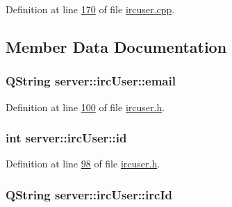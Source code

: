 Definition at line \hyperlink{custom_irc_server_2ircuser_8cpp_source_l00170}{170} of file \hyperlink{custom_irc_server_2ircuser_8cpp_source}{ircuser.\-cpp}.



\subsection{Member Data Documentation}
\hypertarget{classserver_1_1irc_user_aeadaf50889cd947cb5080cb9fe0707bd}{
\subsubsection[{email}]{\setlength{\rightskip}{0pt plus 5cm}Q\-String server\-::irc\-User\-::email\hspace{0.3cm}{\ttfamily [private]}}}\label{d2/d29/classserver_1_1irc_user_aeadaf50889cd947cb5080cb9fe0707bd}


Definition at line \hyperlink{custom_irc_server_2ircuser_8h_source_l00100}{100} of file \hyperlink{custom_irc_server_2ircuser_8h_source}{ircuser.\-h}.

\hypertarget{classserver_1_1irc_user_af55b2056fb7f59055417bda5d3187b4e}{
\subsubsection[{id}]{\setlength{\rightskip}{0pt plus 5cm}int server\-::irc\-User\-::id\hspace{0.3cm}{\ttfamily [private]}}}\label{d2/d29/classserver_1_1irc_user_af55b2056fb7f59055417bda5d3187b4e}


Definition at line \hyperlink{custom_irc_server_2ircuser_8h_source_l00098}{98} of file \hyperlink{custom_irc_server_2ircuser_8h_source}{ircuser.\-h}.

\hypertarget{classserver_1_1irc_user_a0380d5ace6770dbdc30187d348d837ed}{
\subsubsection[{irc\-Id}]{\setlength{\rightskip}{0pt plus 5cm}Q\-String server\-::irc\-User\-::irc\-Id\hspace{0.3cm}{\ttfamily [private]}}}\label{d2/d29/classserver_1_1irc_user_a0380d5ace6770dbdc30187d348d837ed}


